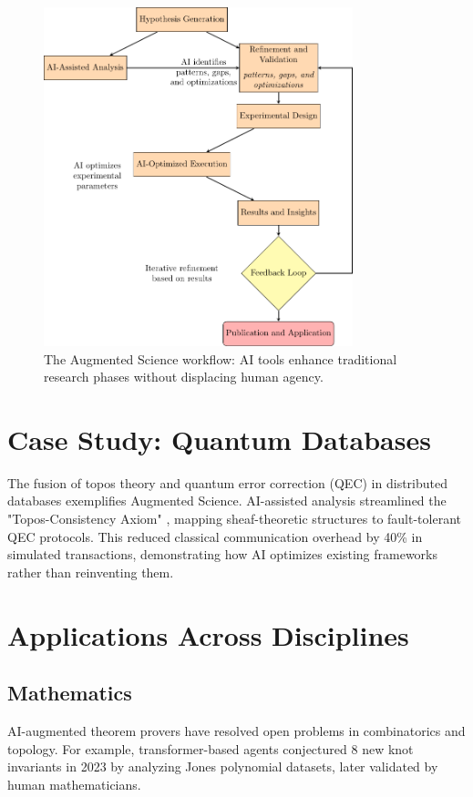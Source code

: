 \documentclass[12pt, a4paper]{article}
\begin{document}
\begin{figure}[h]
    \centering
    \includegraphics[width=0.8\textwidth]{augmented_science_flowchart.pdf}
    \caption{The Augmented Science workflow: AI tools enhance traditional research phases without displacing human agency.}
    \label{fig:flow}
\end{figure}

\section{Case Study: Quantum Databases}
The fusion of topos theory and quantum error correction (QEC) in distributed databases \cite{quantum_databases_expanded} exemplifies Augmented Science. AI-assisted analysis streamlined the "Topos-Consistency Axiom" \cite{dist_qdb_qec_framework}, mapping sheaf-theoretic structures to fault-tolerant QEC protocols. This reduced classical communication overhead by 40\% in simulated transactions, demonstrating how AI optimizes existing frameworks rather than reinventing them.

\section{Applications Across Disciplines}

\subsection{Mathematics}
AI-augmented theorem provers have resolved open problems in combinatorics and topology. For example, transformer-based agents conjectured 8 new knot invariants in 2023 by analyzing Jones polynomial datasets, later validated by human mathematicians.
\end{document}

